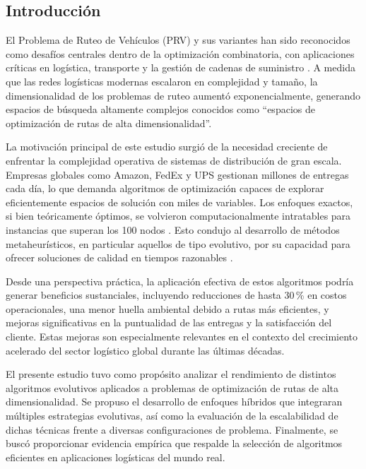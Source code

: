 \documentclass[10pt,a4paper]{article}
\begin{document}
\begin{multicols}{2}
\section{Introducción}

El Problema de Ruteo de Vehículos (PRV) y sus variantes han sido reconocidos como desafíos centrales dentro de la optimización combinatoria, con aplicaciones críticas en logística, transporte y la gestión de cadenas de suministro \cite{toth2014}. A medida que las redes logísticas modernas escalaron en complejidad y tamaño, la dimensionalidad de los problemas de ruteo aumentó exponencialmente, generando espacios de búsqueda altamente complejos conocidos como ``espacios de optimización de rutas de alta dimensionalidad''.

La motivación principal de este estudio surgió de la necesidad creciente de enfrentar la complejidad operativa de sistemas de distribución de gran escala. Empresas globales como Amazon, FedEx y UPS gestionan millones de entregas cada día, lo que demanda algoritmos de optimización capaces de explorar eficientemente espacios de solución con miles de variables. Los enfoques exactos, si bien teóricamente óptimos, se volvieron computacionalmente intratables para instancias que superan los 100 nodos \cite{applegate2007}. Esto condujo al desarrollo de métodos metaheurísticos, en particular aquellos de tipo evolutivo, por su capacidad para ofrecer soluciones de calidad en tiempos razonables \cite{blum2003}.

Desde una perspectiva práctica, la aplicación efectiva de estos algoritmos podría generar beneficios sustanciales, incluyendo reducciones de hasta 30\,\% en costos operacionales, una menor huella ambiental debido a rutas más eficientes, y mejoras significativas en la puntualidad de las entregas y la satisfacción del cliente. Estas mejoras son especialmente relevantes en el contexto del crecimiento acelerado del sector logístico global durante las últimas décadas.

El presente estudio tuvo como propósito analizar el rendimiento de distintos algoritmos evolutivos aplicados a problemas de optimización de rutas de alta dimensionalidad. Se propuso el desarrollo de enfoques híbridos que integraran múltiples estrategias evolutivas, así como la evaluación de la escalabilidad de dichas técnicas frente a diversas configuraciones de problema. Finalmente, se buscó proporcionar evidencia empírica que respalde la selección de algoritmos eficientes en aplicaciones logísticas del mundo real.


\end{multicols}
\end{document}
